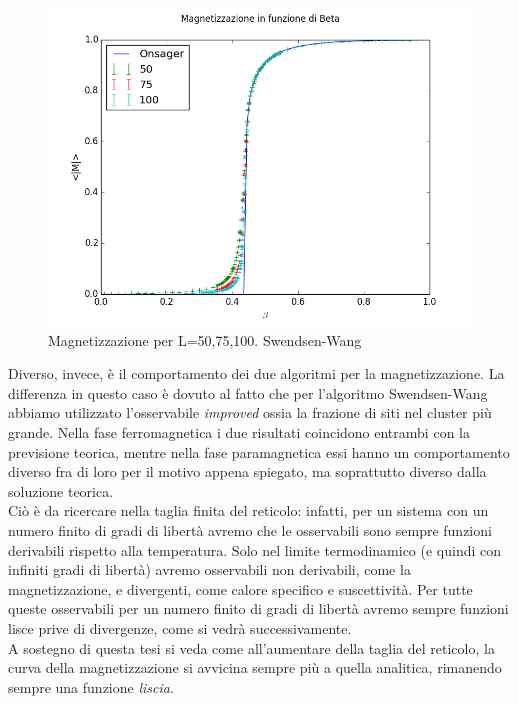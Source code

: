 \begin{center}
	\begin{figure}[h]
		\centering

		\includegraphics[scale=0.5]{sw/mag50100150.png}
		\caption{Magnetizzazione per L=50,75,100. Swendsen-Wang}
	\end{figure}
\end{center}

Diverso, invece, è il comportamento dei due algoritmi per la magnetizzazione. La differenza in questo caso è dovuto al fatto che per l'algoritmo Swendsen-Wang abbiamo utilizzato l'osservabile \emph{improved} ossia la frazione di siti nel cluster più grande.
Nella fase ferromagnetica i due risultati coincidono entrambi con la previsione teorica, mentre nella fase paramagnetica essi hanno un comportamento diverso fra di loro per il motivo appena spiegato, ma soprattutto diverso dalla soluzione teorica. \\
Ciò è da ricercare nella taglia finita del reticolo: infatti, per un sistema con un numero finito di gradi di libertà avremo che le osservabili sono sempre funzioni derivabili rispetto alla temperatura.
Solo nel limite termodinamico (e quindi con infiniti gradi di libertà) avremo osservabili non derivabili, come la magnetizzazione, e divergenti, come calore specifico e suscettività.
Per tutte queste osservabili per un numero finito di gradi di libertà avremo sempre funzioni lisce prive di divergenze, come si vedrà successivamente.\\
A sostegno di questa tesi si veda come all'aumentare della taglia del reticolo, la curva della magnetizzazione si avvicina sempre più a quella analitica, rimanendo sempre una funzione \emph{liscia}.

